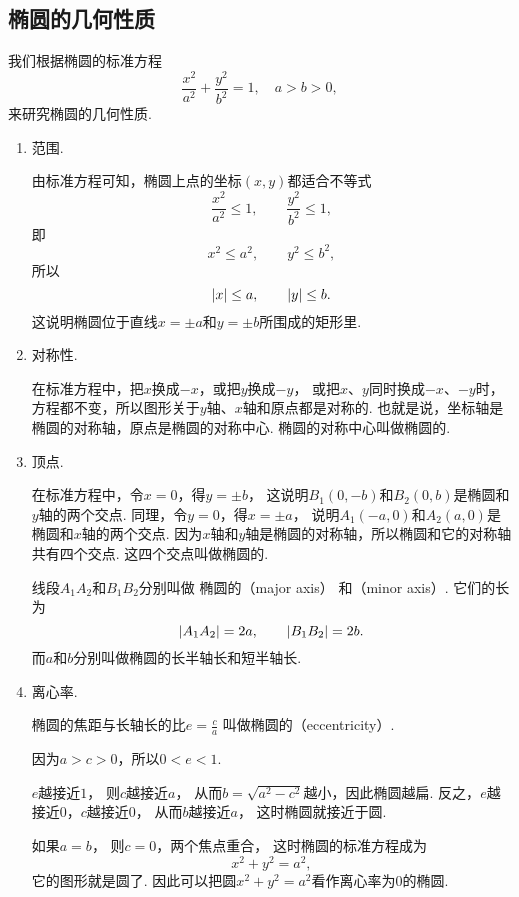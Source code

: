 \subsection{椭圆的几何性质}
我们根据椭圆的标准方程\begin{equation*}
	\frac{x^2}{a^2} + \frac{y^2}{b^2} = 1,
	\quad a > b > 0,
\end{equation*}
来研究椭圆的几何性质.
\begin{enumerate}
	\item 范围.

	由标准方程可知，椭圆上点的坐标\((x,y)\)都适合不等式\begin{equation*}
		\frac{x^2}{a^2} \leq 1,
		\qquad
		\frac{y^2}{b^2} \leq 1,
	\end{equation*}
	即\begin{equation*}
		x^2 \leq a^2, \qquad y^2 \leq b^2,
	\end{equation*}
	所以\begin{equation*}
		\abs{x} \leq a, \qquad \abs{y} \leq b.
	\end{equation*}
	这说明椭圆位于直线\(x=\pm a\)和\(y=\pm b\)所围成的矩形里.

	\item 对称性.

	在标准方程中，把\(x\)换成\(-x\)，或把\(y\)换成\(-y\)，
	或把\(x\)、\(y\)同时换成\(-x\)、\(-y\)时，
	方程都不变，所以图形关于\(y\)轴、\(x\)轴和原点都是对称的.
	也就是说，坐标轴是椭圆的对称轴，原点是椭圆的对称中心.
	椭圆的对称中心叫做椭圆的.

	\item 顶点.

	在标准方程中，令\(x=0\)，得\(y=\pm b\)，
	这说明\(B_1(0,-b)\)和\(B_2(0,b)\)是椭圆和\(y\)轴的两个交点.
	同理，令\(y=0\)，得\(x=\pm a\)，
	说明\(A_1(-a,0)\)和\(A_2(a,0)\)是椭圆和\(x\)轴的两个交点.
	因为\(x\)轴和\(y\)轴是椭圆的对称轴，所以椭圆和它的对称轴共有四个交点.
	这四个交点叫做椭圆的.

	线段\(A_1 A_2\)和\(B_1 B_2\)分别叫做
	椭圆的（major axis）
	和（minor axis）.
	它们的长为\begin{equation*}
		\abs{A_1 A_2} = 2a,
		\qquad
		\abs{B_1 B_2} = 2b.
	\end{equation*}
	而\(a\)和\(b\)分别叫做椭圆的长半轴长和短半轴长.

	\item 离心率.

	椭圆的焦距与长轴长的比\(e = \frac{c}{a}\)
	叫做椭圆的（eccentricity）.

	因为\(a > c > 0\)，所以\(0 < e < 1\).

	\(e\)越接近\(1\)，
	则\(c\)越接近\(a\)，
	从而\(b = \sqrt{a^2 - c^2}\)越小，因此椭圆越扁.
	反之，\(e\)越接近\(0\)，\(c\)越接近\(0\)，
	从而\(b\)越接近\(a\)，
	这时椭圆就接近于圆.

	如果\(a=b\)，
	则\(c=0\)，两个焦点重合，
	这时椭圆的标准方程成为\begin{equation*}
		x^2 + y^2 = a^2,
	\end{equation*}
	它的图形就是圆了.
	因此可以把圆\(x^2+y^2=a^2\)看作离心率为\(0\)的椭圆.
\end{enumerate}

